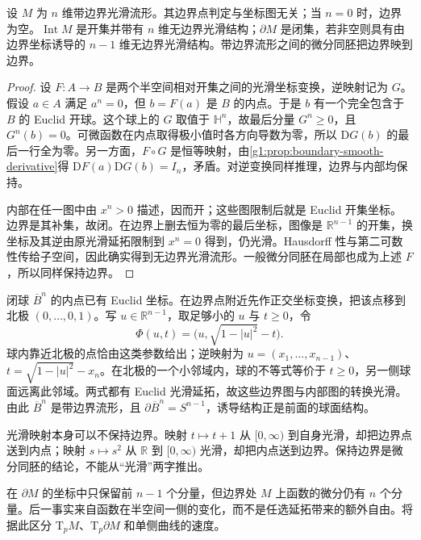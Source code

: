 \begin{proposition}
	\label{g1:prop:boundary-chart-invariance}
	设 \(M\) 为 \(n\) 维带边界光滑流形。其边界点判定与坐标图无关；当 \(n=0\) 时，边界为空。\(\operatorname{Int}M\) 是开集并带有 \(n\) 维无边界光滑结构；\(\partial M\) 是闭集，若非空则具有由边界坐标诱导的 \(n-1\) 维无边界光滑结构。带边界流形之间的微分同胚把边界映到边界。
\end{proposition}

\begin{proof}
	设 \(F:A\to B\) 是两个半空间相对开集之间的光滑坐标变换，逆映射记为 \(G\)。假设 \(a\in A\) 满足 \(a^n=0\)，但 \(b=F(a)\) 是 \(B\) 的内点。于是 \(b\) 有一个完全包含于 \(B\) 的 Euclid 开球。这个球上的 \(G\) 取值于 \(\mathbb H^n\)，故最后分量 \(G^n\geq0\)，且 \(G^n(b)=0\)。可微函数在内点取得极小值时各方向导数为零，所以 \(\mathrm{D}G(b)\) 的最后一行全为零。另一方面，\(F\circ G\) 是恒等映射，由\cref{g1:prop:boundary-smooth-derivative}得 \(\mathrm{D}F(a)\mathrm{D}G(b)=I_n\)，矛盾。对逆变换同样推理，边界与内部均保持。

	内部在任一图中由 \(x^n>0\) 描述，因而开；这些图限制后就是 Euclid 开集坐标。边界是其补集，故闭。在边界上删去恒为零的最后坐标，图像是 \(\mathbb R^{n-1}\) 的开集，换坐标及其逆由原光滑延拓限制到 \(x^n=0\) 得到，仍光滑。Hausdorff 性与第二可数性传给子空间，因此确实得到无边界光滑流形。一般微分同胚在局部也成为上述 \(F\)，所以同样保持边界。
\end{proof}

\begin{example}
	\label{g1:exm:closed-ball-boundary}
	闭球 \(\overline B^n\) 的内点已有 Euclid 坐标。在边界点附近先作正交坐标变换，把该点移到北极 \((0,\ldots,0,1)\)。写 \(u\in\mathbb R^{n-1}\)，取足够小的 \(u\) 与 \(t\geq0\)，令
	\[
		\Phi(u,t)=\bigl(u,\sqrt{1-|u|^2}-t\bigr).
	\]
	球内靠近北极的点恰由这类参数给出；逆映射为 \(u=(x_1,\ldots,x_{n-1})\)、\(t=\sqrt{1-|u|^2}-x_n\)。在北极的一个小邻域内，球的不等式等价于 \(t\geq0\)，另一侧球面远离此邻域。两式都有 Euclid 光滑延拓，故这些边界图与内部图的转换光滑。由此 \(\overline B^n\) 是带边界流形，且 \(\partial\overline B^n=S^{n-1}\)，诱导结构正是前面的球面结构。

	光滑映射本身可以不保持边界。映射 \(t\mapsto t+1\) 从 \([0,\infty)\) 到自身光滑，却把边界点送到内点；映射 \(s\mapsto s^2\) 从 \(\mathbb R\) 到 \([0,\infty)\) 光滑，却把内点送到边界。保持边界是微分同胚的结论，不能从“光滑”两字推出。
\end{example}

在 \(\partial M\) 的坐标中只保留前 \(n-1\) 个分量，但边界处 \(M\) 上函数的微分仍有 \(n\) 个分量。后一事实来自函数在半空间一侧的变化，而不是任选延拓带来的额外自由。将据此区分 \(\mathrm{T}_pM\)、\(\mathrm{T}_p\partial M\) 和单侧曲线的速度。

